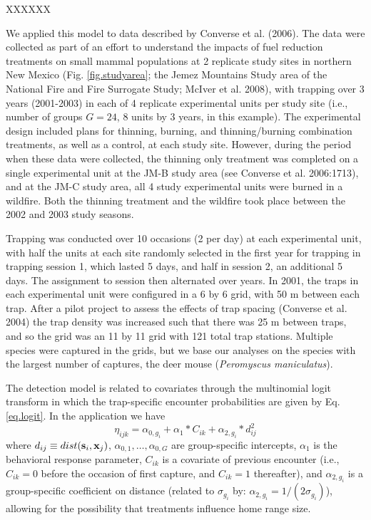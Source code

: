 XXXXXX






We applied this model to data described by Converse et al. (2006). The
data were collected as part of an effort to understand the impacts of
fuel reduction treatments on small mammal populations at 2 replicate
study sites in northern New Mexico (Fig. \ref{fig.studyarea}; 
the Jemez Mountains Study area of
the National Fire and Fire Surrogate Study; McIver et al. 2008), with
trapping over 3 years (2001-2003) in each of 4 replicate experimental
units per study site (i.e., number of groups $G = 24$, 8 units by 3
years, in this example).  The experimental design included plans for
thinning, burning, and thinning/burning combination treatments, as
well as a control, at each study site. However, during the period when
these data were collected, the thinning only treatment was completed
on a single experimental unit at the JM-B study area (see Converse et
al. 2006:1713), and at the JM-C study area, all 4 study experimental
units were burned in a wildfire. Both the thinning treatment and the
wildfire took place between the 2002 and 2003 study seasons.

Trapping was conducted over 10 occasions (2 per day) at each
experimental unit, with half the units at each site randomly selected
in the first year for trapping in trapping session 1, which lasted 5
days, and half in session 2, an additional 5 days. The assignment to
session then alternated over years.  In 2001, the traps in each
experimental unit were configured in a 6 by 6 grid, with 50 m between
each trap. After a pilot project to assess the effects of trap spacing
(Converse et al. 2004) the trap density was increased such that there
was 25 m between traps, and so the grid was an 11 by 11 grid with 121
total trap stations. Multiple species were captured in the grids, but
we base our analyses on the species with the largest number of
captures, the deer mouse ({\it Peromyscus maniculatus}).

The detection model is related to covariates through the multinomial
logit transform in which the trap-specific encounter probabilities are
given by Eq. \ref{eq.logit}.  In the application we have
\[
\eta_{ijk}=\alpha_{0,g_{i}} + \alpha_{1}*C_{ik}+\alpha_{2,g_{i}}*d_{ij}^{2} 
\]
where $d_{ij} \equiv dist({\bf s}_{i},{\bf x}_{j})$,
$\alpha_{0,1},\ldots, \alpha_{0,G}$ are group-specific intercepts,
$\alpha_{1}$ is the behavioral response parameter, $C_{ik}$ is a
covariate of previous encounter (i.e., $C_{ik} = 0$ before the
occasion of first capture, and $C_{ik} = 1$ thereafter), and
$\alpha_{2,g_{i}}$ is a group-specific coefficient on distance
(related to $\sigma_{g_{i}}$ by: $\alpha_{2,g_{i}} =
1/(2\sigma_{g_{i}})$), allowing for the possibility that treatments
influence home range size.


